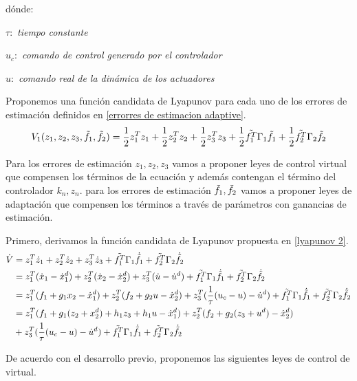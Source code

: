 dónde:

$\tau:$ \textit{tiempo constante}


$u_{c}:$ \textit{comando de control generado por el controlador} 


$u:$ \textit{comando real de la dinámica de los actuadores}


Proponemos una función candidata de Lyapunov para cada uno de los errores de estimación definidos en \ref{errorres de estimacion adaptive}. 
\begin{equation}
    V_1 (z_1, z_2, z_3, \Tilde{f_1}, \Tilde{f_2}) = \frac{1}{2} z_1^T z_1 + \frac{1}{2} z_2^T z_2 + \frac{1}{2} z_3^T z_3 + \frac{1}{2} \Tilde{f_1^T} \Gamma_1 \Tilde{f_1} + \frac{1}{2} \Tilde{f_2^T} \Gamma_2 \Tilde{f_2}
\label{lyapunov 2}
\end{equation}

Para los errores de estimación $z_1, z_2,z_3$ vamos a proponer leyes de control virtual que compensen los términos de la ecuación y además contengan el término del controlador $k_n, z_n$. 
para los errores de estimación $ \Tilde{f_1}, \Tilde{f_2}$ vamos a proponer leyes de adaptación que compensen los términos a través de parámetros con ganancias de estimación. 

Primero, derivamos la función candidata de Lyapunov propuesta en \ref{lyapunov 2}. 
\begin{align}
       \dot V &= z^T_1 \dot z_1 + z^T_2 \dot z_2 + z^T_3 \dot z_3 + \Tilde{f_1^T}  \Gamma_1 \dot{\Tilde{f_1}} + \Tilde{f_2^T} \Gamma_2 \dot{\Tilde{f_2}} \nonumber \\
        &= z^T_1 (\dot x_1 - \dot x^d_1) + z^T_2 (\dot x_2 - \dot x^d_2) + z^T_3 (\dot u - \dot u^d) + \Tilde{f_1^T}  \Gamma_1 \dot{\Tilde{f_1}} + \Tilde{f_2^T} \Gamma_2 \dot{\Tilde{f_2}} \nonumber \\ 
    &= z^T_1 (f_1 + g_{1} x_2 - \dot x^d_1) + z^T_2 (f_2 + g_{2} u - \dot x^d_2) + z^T_3 (\frac{1}{\tau}(u_c - u) - \dot u^d) + \Tilde{f_1^T}  \Gamma_1 \dot{\Tilde{f_1}} + \Tilde{f_2^T} \Gamma_2 \dot{\Tilde{f_2}} \nonumber \\
    &= z^T_1 (f_1 + g_{1} (z_2 + x_{2}^d)  + h_1 z_3 + h_1 u - \dot x^d_1) + z^T_2 (f_2 + g_{2} (z_3 + u^d) - \dot x^d_2)  \nonumber \\
    &+ z^T_3 (\frac{1}{\tau}(u_c - u) - \dot u^d) + \Tilde{f_1^T}  \Gamma_1 \dot{\Tilde{f_1}} + \Tilde{f_2^T} \Gamma_2 \dot{\Tilde{f_2}}
\end{align}


De acuerdo con el desarrollo previo, proponemos las siguientes leyes de control de virtual. 


